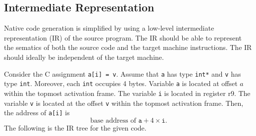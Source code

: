 \documentclass[a4paper, openany]{memoir}
\begin{document}
\subsection{Intermediate Representation}
Native code generation is simplified by using a low-level intermediate representation (IR) of the source program. The IR should be able to represent the sematics of both the source code and the target machine instructions. The IR should ideally be independent of the target machine.

Consider the C assignment \texttt{a[i] = v}. Assume that \texttt{a} has type \texttt{int*} and \texttt{v} has type \texttt{int}. Moreover, each \texttt{int} occupies 4 bytes. Variable \texttt{a} is located at offset $a$ within the topmost activation frame. The variable \texttt{i} is located in register r9. The variable \texttt{v} is located at the offset \texttt{v} within the topmost activation frame. Then, the address of \texttt{a[i]} is
\[\text{base address of } \texttt{a} + 4 \times \texttt{i}.\]
The following is the IR tree for the given code.
\begin{figure}[H]
    \centering
\end{figure}
\end{document}
